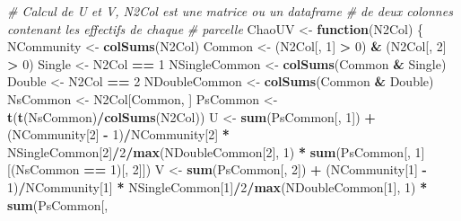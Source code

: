 \documentclass[
  11pt,
  french,
  a4paper,
  extrafontsizes,onecolumn,openright
  ]{memoir}
\newenvironment{Shaded}{\begin{snugshade}}{\end{snugshade}}
\newcommand{\CommentTok}[1]{\textcolor[rgb]{0.56,0.35,0.01}{\textit{#1}}}
\newcommand{\ControlFlowTok}[1]{\textcolor[rgb]{0.13,0.29,0.53}{\textbf{#1}}}
\newcommand{\DecValTok}[1]{\textcolor[rgb]{0.00,0.00,0.81}{#1}}
\newcommand{\KeywordTok}[1]{\textcolor[rgb]{0.13,0.29,0.53}{\textbf{#1}}}
\newcommand{\NormalTok}[1]{#1}
\newcommand{\OperatorTok}[1]{\textcolor[rgb]{0.81,0.36,0.00}{\textbf{#1}}}
\newcommand{\StringTok}[1]{\textcolor[rgb]{0.31,0.60,0.02}{#1}}
\begin{document}
\begin{Shaded}
\begin{Highlighting}[]
\CommentTok{# Calcul de U et V, N2Col est une matrice ou un dataframe}
\CommentTok{# de deux colonnes contenant les effectifs de chaque}
\CommentTok{# parcelle}
\NormalTok{ChaoUV <-}\StringTok{ }\ControlFlowTok{function}\NormalTok{(N2Col) \{}
\NormalTok{    NCommunity <-}\StringTok{ }\KeywordTok{colSums}\NormalTok{(N2Col)}
\NormalTok{    Common <-}\StringTok{ }\NormalTok{(N2Col[, }\DecValTok{1}\NormalTok{] }\OperatorTok{>}\StringTok{ }\DecValTok{0}\NormalTok{) }\OperatorTok{&}\StringTok{ }\NormalTok{(N2Col[, }\DecValTok{2}\NormalTok{] }\OperatorTok{>}\StringTok{ }\DecValTok{0}\NormalTok{)}
\NormalTok{    Single <-}\StringTok{ }\NormalTok{N2Col }\OperatorTok{==}\StringTok{ }\DecValTok{1}
\NormalTok{    NSingleCommon <-}\StringTok{ }\KeywordTok{colSums}\NormalTok{(Common }\OperatorTok{&}\StringTok{ }\NormalTok{Single)}
\NormalTok{    Double <-}\StringTok{ }\NormalTok{N2Col }\OperatorTok{==}\StringTok{ }\DecValTok{2}
\NormalTok{    NDoubleCommon <-}\StringTok{ }\KeywordTok{colSums}\NormalTok{(Common }\OperatorTok{&}\StringTok{ }\NormalTok{Double)}
\NormalTok{    NsCommon <-}\StringTok{ }\NormalTok{N2Col[Common, ]}
\NormalTok{    PsCommon <-}\StringTok{ }\KeywordTok{t}\NormalTok{(}\KeywordTok{t}\NormalTok{(NsCommon)}\OperatorTok{/}\KeywordTok{colSums}\NormalTok{(N2Col))}
\NormalTok{    U <-}\StringTok{ }\KeywordTok{sum}\NormalTok{(PsCommon[, }\DecValTok{1}\NormalTok{]) }\OperatorTok{+}\StringTok{ }\NormalTok{(NCommunity[}\DecValTok{2}\NormalTok{] }\OperatorTok{-}\StringTok{ }\DecValTok{1}\NormalTok{)}\OperatorTok{/}\NormalTok{NCommunity[}\DecValTok{2}\NormalTok{] }\OperatorTok{*}
\StringTok{        }\NormalTok{NSingleCommon[}\DecValTok{2}\NormalTok{]}\OperatorTok{/}\DecValTok{2}\OperatorTok{/}\KeywordTok{max}\NormalTok{(NDoubleCommon[}\DecValTok{2}\NormalTok{], }\DecValTok{1}\NormalTok{) }\OperatorTok{*}\StringTok{ }\KeywordTok{sum}\NormalTok{(PsCommon[,}
        \DecValTok{1}\NormalTok{][(NsCommon }\OperatorTok{==}\StringTok{ }\DecValTok{1}\NormalTok{)[, }\DecValTok{2}\NormalTok{]])}
\NormalTok{    V <-}\StringTok{ }\KeywordTok{sum}\NormalTok{(PsCommon[, }\DecValTok{2}\NormalTok{]) }\OperatorTok{+}\StringTok{ }\NormalTok{(NCommunity[}\DecValTok{1}\NormalTok{] }\OperatorTok{-}\StringTok{ }\DecValTok{1}\NormalTok{)}\OperatorTok{/}\NormalTok{NCommunity[}\DecValTok{1}\NormalTok{] }\OperatorTok{*}
\StringTok{        }\NormalTok{NSingleCommon[}\DecValTok{1}\NormalTok{]}\OperatorTok{/}\DecValTok{2}\OperatorTok{/}\KeywordTok{max}\NormalTok{(NDoubleCommon[}\DecValTok{1}\NormalTok{], }\DecValTok{1}\NormalTok{) }\OperatorTok{*}\StringTok{ }\KeywordTok{sum}\NormalTok{(PsCommon[,}

\end{Highlighting}
\end{Shaded}
\end{document}
